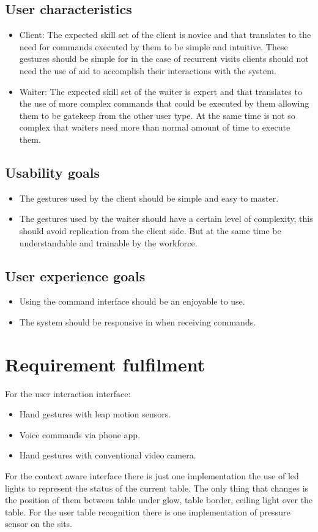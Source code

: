 \documentclass{article}
\begin{document}
\subsection{User characteristics}
\begin{itemize}
    \item Client: The expected skill set of the client is novice and that translates to the need for commands executed by them to be simple and intuitive. These gestures should be simple for in the case of recurrent visits clients should not need the use of aid to accomplish their interactions with the system.
    \item Waiter: The expected skill set of the waiter is expert and that translates to the use of more complex commands that could be executed by them allowing them to be gatekeep from the other user type. At the same time is not so complex that waiters need more than normal amount of time to execute them.
\end{itemize}
\subsection{Usability goals}
\begin{itemize}
    \item The gestures used by the client should be simple and easy to master.
    \item The gestures used by the waiter should have a certain level of complexity, this should avoid replication from the client side. But at the same time be understandable and trainable by the workforce.
\end{itemize}
\subsection{User experience goals}
\begin{itemize}
    \item Using the command interface should be an enjoyable to use.
    \item The system should be responsive in when receiving commands.
\end{itemize}
\section{Requirement fulfilment}
For the user interaction interface:
\begin{itemize}
    \item Hand gestures with leap motion sensors.
    \item Voice commands via phone app.
    \item Hand gestures with conventional video camera.
\end{itemize}
For the context aware interface there is just one implementation the use of led lights to represent the status of the current table. The only thing that changes is the position of them between table under glow, table border, ceiling light over the table.
For the user table recognition there is one implementation of pressure sensor on the sits.
\end{document}
